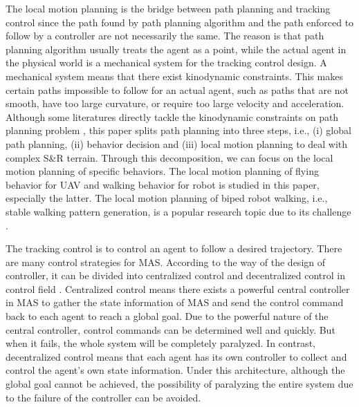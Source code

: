 \documentclass[journal,12pt,onecolumn,draftclsnofoot,]{IEEEtran}
\begin{document}

The local motion planning is the bridge between path planning and tracking control since the path found by path planning algorithm and the path enforced to follow by a controller are not necessarily the same. The reason is that path planning algorithm usually treats the agent as a point, while the actual agent in the physical world is a mechanical system for the tracking control design. A mechanical system means that there exist kinodynamic constraints. This makes certain paths impossible to follow for an actual agent, such as paths that are not smooth, have too large curvature, or require too large velocity and acceleration. Although some literatures directly tackle the kinodynamic constraints on path planning problem \cite{9384209}, this paper splits path planning into three steps, i.e., (i) global path planning, (ii) behavior decision and (iii) local motion planning to deal with complex S\&R terrain. Through this decomposition, we can focus on the local motion planning of specific behaviors. The local motion planning of flying behavior for UAV and walking behavior for robot is studied in this paper, especially the latter. The local motion planning of biped robot walking, i.e., stable walking pattern generation, is a popular research topic due to its challenge \cite{olcay2017design}.

The tracking control is to control an agent to follow a desired trajectory. There are many control strategies for MAS. According to the way of the design of controller, it can be divided into centralized control and decentralized control in control field \cite{8931370}. Centralized control means there exists a powerful central controller in MAS to gather the state information of MAS and send the control command back to each agent to reach a global goal. Due to the powerful nature of the central controller, control commands can be determined well and quickly. But when it fails, the whole system will be completely paralyzed. In contrast, decentralized control means that each agent has its own controller to collect and control the agent's own state information. Under this architecture, although the global goal cannot be achieved, the possibility of paralyzing the entire system due to the failure of the controller can be avoided.
\end{document}
